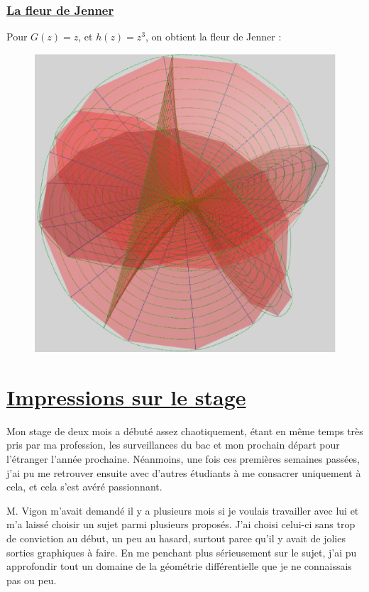\documentclass {report}
\begin{document}
\subsection[La fleur de Jenner]{\uline{La fleur de Jenner}}


Pour $G(z)=z$, et $h(z)=z^3$, on obtient la fleur de Jenner : 

\begin{figure}[h!]
      \centering 
      \includegraphics[scale=0.25]{Images_Fichiers/15.eps}
\end{figure}



\chapter[Impressions sur le stage]{\uline{Impressions sur le stage}}

Mon stage de deux mois a débuté assez chaotiquement, étant en même temps très pris par ma profession, les surveillances du bac et mon prochain départ pour l'étranger l'année prochaine. Néanmoins, une fois ces premières semaines passées, j'ai pu me retrouver ensuite avec d'autres étudiants à me consacrer uniquement à cela, et cela s'est avéré passionnant. 

M. Vigon m'avait demandé il y a plusieurs mois si je voulais travailler avec lui et m'a laissé choisir un sujet parmi plusieurs proposés. J'ai choisi celui-ci sans trop de conviction au début, un peu au hasard, surtout parce qu'il y avait de jolies sorties graphiques à faire. En me penchant plus sérieusement sur le sujet, j'ai pu approfondir tout un domaine de la géométrie différentielle que je ne connaissais pas ou peu. 
\end{document}

